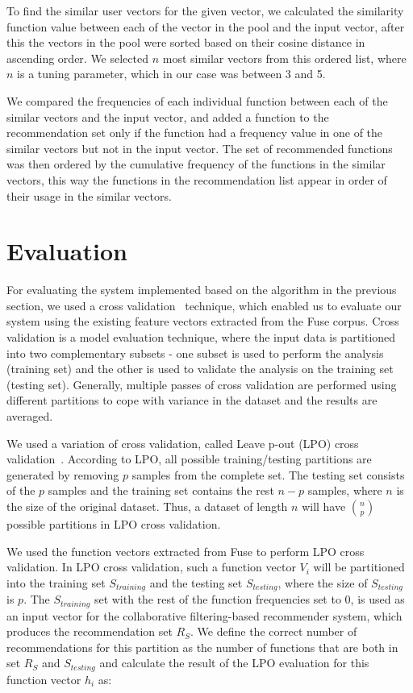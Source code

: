 \documentclass[conference]{IEEEtran}
\begin{document}
To find the similar user vectors for the given vector, we calculated the similarity function value between each of the vector in the pool and the input vector, after this the vectors in the pool were sorted based on their cosine distance in ascending order. We selected $n$ most similar vectors from this ordered list, where $n$ is a tuning parameter, which in our case was between 3 and 5.

We compared the frequencies of each individual function between each of the similar vectors and the input vector, and added a function to the recommendation set only if the function had a frequency value in one of the similar vectors but not in the input vector. The set of recommended functions was then ordered by the cumulative frequency of the functions in the similar vectors, this way the functions in the recommendation list appear in order of their usage in the similar vectors.

\section{Evaluation}
For evaluating the system implemented based on the algorithm in the previous section, we used a cross validation~\cite{Kohavi95astudy} technique, which enabled us to evaluate our system using the existing feature vectors extracted from the Fuse corpus. Cross validation is a model evaluation technique, where the input data is partitioned into two complementary subsets - one subset is used to perform the analysis (training set) and the other is used to validate the analysis on the training set (testing set). Generally, multiple passes of cross validation are performed using different partitions  to cope with variance in the dataset and the results are averaged.

We used a variation of cross validation, called Leave p-out (LPO) cross validation~\cite{arlot2010survey}. According to LPO, all possible training/testing partitions are generated by removing $p$ samples from the complete set. The testing set consists of the $p$ samples and the training set contains the rest $n-p$ samples, where $n$ is the size of the original dataset. Thus, a dataset of length $n$ will have $n \choose p$ possible partitions in LPO cross validation.

We used the function vectors extracted from Fuse to perform LPO cross validation. In LPO cross validation, such a function vector $V_i$ will be partitioned into the training set $S_{training}$ and the testing set $S_{testing}$, where the size of $S_{testing}$ is $p$. The $S_{training}$ set with the rest of the function frequencies set to 0, is used as an input vector for the collaborative filtering-based recommender system, which produces the recommendation set $R_S$. We define the correct number of recommendations for this partition as the number of functions that are both in set $R_S$ and $S_{testing}$ and calculate the result of the LPO evaluation for this function vector $h_i$ as:
\end{document}
